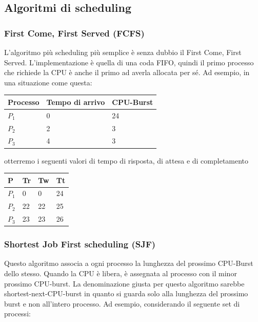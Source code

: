 \documentclass[a4paper]{article}
\begin{document}
\subsection{Algoritmi di scheduling}

\subsubsection{First Come, First Served (FCFS)}
L'algoritmo più scheduling più semplice è senza dubbio il First Come, First Served. L'implementazione è quella di una coda FIFO, quindi il primo processo che richiede la CPU è anche il primo ad averla allocata per sé.\newline
Ad esempio, in una situazione come questa:

\begin{table}[h!]
    \centering
    \label{my-label}
    \begin{tabular}{lll}
        Processo & Tempo di arrivo & CPU-Burst \\ \hline
        $P_1$    & 0               & 24        \\
        $P_2$    & 2               & 3         \\
        $P_3$    & 4               & 3
    \end{tabular}
\end{table}

otterremo i seguenti valori di tempo di risposta, di attesa e di completamento

\begin{table}[h!]
    \centering
    \label{my-label}
    \begin{tabular}{llll}
        P     & Tr & Tw & Tt \\ \hline
        $P_1$ & 0  & 0  & 24 \\
        $P_2$ & 22 & 22 & 25 \\
        $P_3$ & 23 & 23 & 26
    \end{tabular}
\end{table}

\subsubsection{Shortest Job First scheduling (SJF)}
Questo algoritmo associa a ogni processo la lunghezza del prossimo CPU-Burst dello stesso. Quando la CPU è libera, è assegnata al processo con il minor prossimo CPU-burst. La denominazione giusta per questo algoritmo sarebbe shortest-next-CPU-burst in quanto si guarda solo alla lunghezza del prossimo burst e non all'intero processo. \newline
Ad esempio, considerando il seguente set di processi:
\end{document}
